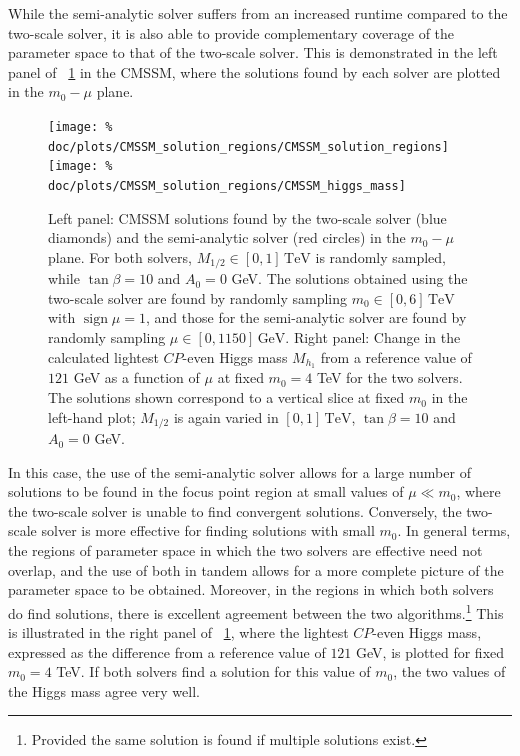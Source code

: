 \documentclass[final,3p,11pt,pdflatex]{elsarticle}
\newcommand{\unit}[1]{\,\text{#1}}      %
\newcommand{\figref}[1]{\figurename~\ref{#1}}
\newcommand{\CP}{\ensuremath{CP}\xspace}
\newcommand{\azero}{\ensuremath{A_0}\xspace}
\newcommand{\mhalf}{\ensuremath{M_{1/2}}\xspace}
\newcommand{\mzero}{\ensuremath{m_0}\xspace}
\DeclareMathOperator{\sign}{sign}
\begin{document}
While the semi-analytic solver suffers from an increased runtime compared to
the two-scale solver, it is also able to provide complementary coverage of the
parameter space to that of the two-scale solver.  This is demonstrated in the left panel of
\figref{fig:cmssm_solution_regions} in the CMSSM, where the solutions found
by each solver are plotted in the $\mzero - \mu$ plane.
%
\begin{figure}
  \centering
  \texttt{[image: \%
    doc/plots/CMSSM\_solution\_regions/CMSSM\_solution\_regions]}
  \texttt{[image: \%
    doc/plots/CMSSM\_solution\_regions/CMSSM\_higgs\_mass]}
  \caption{Left panel: CMSSM solutions found by the two-scale solver (blue diamonds)
    and the semi-analytic solver (red circles) in the $\mzero - \mu$ plane.
    For both solvers, $\mhalf \in [0,1]\unit{TeV}$ is randomly sampled,
    while $\tan\beta = 10$ and $\azero = 0$ GeV\@.  The solutions obtained
    using the two-scale solver are found by randomly sampling
    $\mzero \in [0, 6]\unit{TeV}$ with $\sign \mu = 1$, and those for the
    semi-analytic solver are found by randomly sampling $\mu \in [0,1150]
    \unit{GeV}$.  Right panel: Change in the calculated lightest \CP-even
    Higgs mass $M_{h_1}$ from a reference value of $121$ GeV as a
    function of $\mu$ at fixed $\mzero = 4$ TeV for the two solvers.  The
    solutions shown correspond to a vertical slice at fixed $\mzero$ in the
    left-hand plot; $\mhalf$ is again varied in $[0,1]\unit{TeV}$,
    $\tan\beta = 10$ and $\azero = 0$ GeV.}
  \label{fig:cmssm_solution_regions}
\end{figure}
%
In this case, the use of the semi-analytic solver allows for a large number
of solutions to be found in the focus point region \cite{Chan:1997bi,
  Feng:1999hg,Feng:1999mn} at small values of $\mu \ll \mzero$, where the
two-scale solver is unable to find convergent solutions.  Conversely,
the two-scale solver is more effective for finding solutions with small
$\mzero$.  In general terms, the regions of parameter space in which the two
solvers are effective need not overlap, and the use of both in tandem allows
for a more complete picture of the parameter space to be obtained.  Moreover,
in the regions in which both solvers do find solutions, there is excellent
agreement between the two algorithms.\footnote{Provided the same solution is
  found if multiple solutions exist.}  This is illustrated in the right
panel of \figref{fig:cmssm_solution_regions}, where the lightest \CP-even
Higgs mass, expressed as the difference from a reference value of $121$ GeV,
is plotted for fixed $\mzero = 4$ TeV\@.  If both solvers find a solution for
this value of $\mzero$, the two values of the Higgs mass agree very well.
\end{document}
